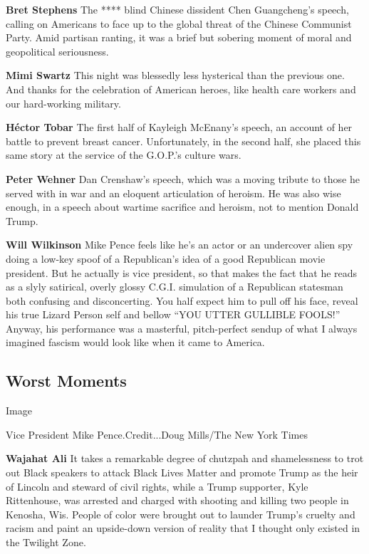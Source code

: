 \textbf{Bret Stephens} The **** blind Chinese dissident Chen
Guangcheng's speech, calling on Americans to face up to the global
threat of the Chinese Communist Party. Amid partisan ranting, it was a
brief but sobering moment of moral and geopolitical seriousness.

\textbf{Mimi Swartz} This night was blessedly less hysterical than the
previous one. And thanks for the celebration of American heroes, like
health care workers and our hard-working military.

\textbf{Héctor Tobar} The first half of Kayleigh McEnany's speech, an
account of her battle to prevent breast cancer. Unfortunately, in the
second half, she placed this same story at the service of the G.O.P.'s
culture wars.

\textbf{Peter Wehner} Dan Crenshaw's speech, which was a moving tribute
to those he served with in war and an eloquent articulation of heroism.
He was also wise enough, in a speech about wartime sacrifice and
heroism, not to mention Donald Trump.

\textbf{Will Wilkinson} Mike Pence feels like he's an actor or an
undercover alien spy doing a low-key spoof of a Republican's idea of a
good Republican movie president. But he actually is vice president, so
that makes the fact that he reads as a slyly satirical, overly glossy
C.G.I. simulation of a Republican statesman both confusing and
disconcerting. You half expect him to pull off his face, reveal his true
Lizard Person self and bellow ``YOU UTTER GULLIBLE FOOLS!'' Anyway, his
performance was a masterful, pitch-perfect sendup of what I always
imagined fascism would look like when it came to America.

\hypertarget{worst-moments}{%
\subsection{Worst Moments}\label{worst-moments}}

Image

Vice President Mike Pence.Credit...Doug Mills/The New York Times

\textbf{Wajahat Ali} It takes a remarkable degree of chutzpah and
shamelessness to trot out Black speakers to attack Black Lives Matter
and promote Trump as the heir of Lincoln and steward of civil rights,
while a Trump supporter, Kyle Rittenhouse, was arrested and charged with
shooting and killing two people in Kenosha, Wis. People of color were
brought out to launder Trump's cruelty and racism and paint an
upside-down version of reality that I thought only existed in the
Twilight Zone.

